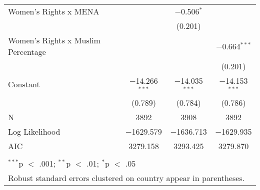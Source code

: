 \begin{table}[!htbp]
\begin{tabular}{@{\extracolsep{5pt}}lccc}
  Women's Rights x MENA &  & $-$0.506$^{*}$ &  \\ 
  &  & (0.201) &  \\ 
  Women's Rights x Muslim Percentage &  &  & $-$0.664$^{***}$ \\ 
  &  &  & (0.201) \\ 
  Constant & $-$14.266$^{***}$ & $-$14.035$^{***}$ & $-$14.153$^{***}$ \\ 
  & (0.789) & (0.784) & (0.786) \\ 
 N & 3892 & 3908 & 3892 \\ 
Log Likelihood & $-$1629.579 & $-$1636.713 & $-$1629.935 \\ 
AIC & 3279.158 & 3293.425 & 3279.870 \\ 
\hline \\[-1.8ex] 
\multicolumn{4}{l}{$^{***}$p $<$ .001; $^{**}$p $<$ .01; $^{*}$p $<$ .05} \\ 
\multicolumn{4}{l}{Robust standard errors clustered on country appear in parentheses.} \\ 
\end{tabular} 
\end{table} 
